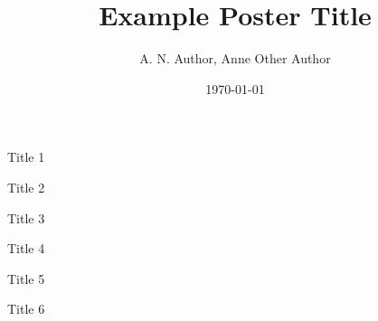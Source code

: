 \documentclass{beamer}
\title{Example Poster Title}
\author{A. N. Author, Anne Other Author}
\date{\today}
\begin{document}
\begin{frame}[t]
\maketitle
\makefooter

\vspace*{1cm}
\begin{postercolumn}{0.0167}
  \begin{posterblock}{Title 1}
    \lipsum[1]
  \end{posterblock}

  \begin{posterblock}{Title 2}
    \lipsum[2]
  \end{posterblock}

  \begin{posterblock}{Title 3}
    \lipsum[3]
  \end{posterblock}
\end{postercolumn}

\begin{postercolumn}{0.3467}
    \begin{posterblock}{Title 4}
    \lipsum[4]
  \end{posterblock}
\end{postercolumn}


\begin{postercolumn}{0.6767}
  \begin{posterblock}{Title 5}
    \lipsum[5]
  \end{posterblock}
  \begin{posterblock}{Title 6}
    \lipsum[6]
  \end{posterblock}
\end{postercolumn}

\end{frame}
\end{document}
